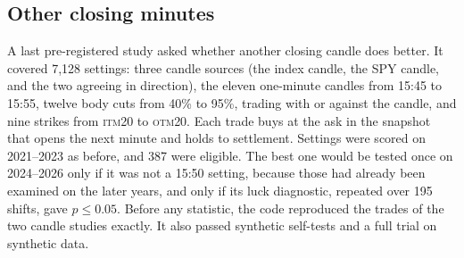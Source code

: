 \documentclass[12pt,letterpaper]{article}
\newcommand{\ITM}[1]{\textsc{itm}#1}
\newcommand{\OTM}[1]{\textsc{otm}#1}
\begin{document}
\subsection{Other closing minutes}
\label{sec:minutes}

A last pre-registered study asked whether another closing candle does better. It
covered 7{,}128 settings: three candle sources (the index candle, the SPY candle,
and the two agreeing in direction), the eleven one-minute candles from 15:45 to
15:55, twelve body cuts from 40\% to 95\%, trading with or against the candle,
and nine strikes from \ITM{20} to \OTM{20}. Each trade buys at the ask in the
snapshot that opens the next minute and holds to settlement. Settings were scored
on 2021--2023 as before, and 387 were eligible. The best one would be tested once
on 2024--2026 only if it was not a 15:50 setting, because those had already been
examined on the later years, and only if its luck diagnostic, repeated over 195
shifts, gave $p \le 0.05$. Before any statistic, the code reproduced the trades of
the two candle studies exactly. It also passed synthetic self-tests and a full
trial on synthetic data.
\end{document}
